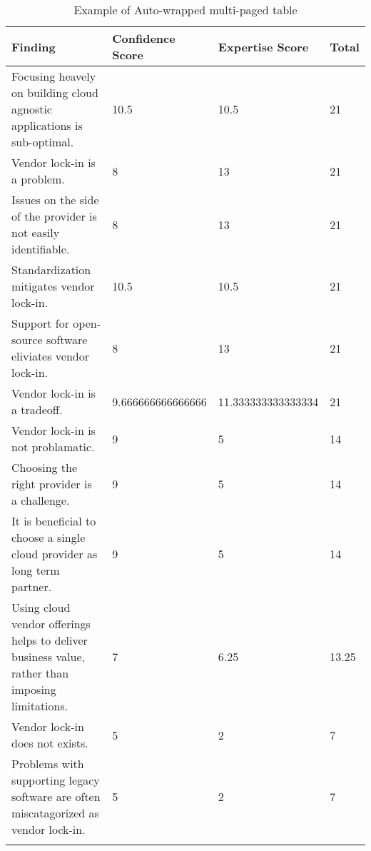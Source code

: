 
\renewcommand\arraystretch{1.5}%
\begin{longtable}{|p{10cm}|p{2cm}|p{2cm}|}
\hline
\textbf{Finding}  & \textbf{Confidence Score} & \textbf{Expertise Score} & \textbf{Total} \\ \hline
\endhead
Focusing heavely on building cloud agnostic applications is sub-optimal. & 10.5 & 10.5 & 21 \\ \hline
Vendor lock-in is a problem. & 8 & 13 & 21 \\ \hline
Issues on the side of the provider is not easily identifiable. & 8 & 13 & 21 \\ \hline
Standardization mitigates vendor lock-in. & 10.5 & 10.5 & 21 \\ \hline
Support for open-source software eliviates vendor lock-in. & 8 & 13 & 21 \\ \hline
Vendor lock-in is a tradeoff. & 9.666666666666666 & 11.333333333333334 & 21 \\ \hline
Vendor lock-in is not problamatic. & 9 & 5 & 14 \\ \hline
Choosing the right provider is a challenge. & 9 & 5 & 14 \\ \hline
It is beneficial to choose a single cloud provider as long term partner. & 9 & 5 & 14 \\ \hline
Using cloud vendor offerings helps to deliver business value, rather than imposing limitations. & 7 & 6.25 & 13.25 \\ \hline
Vendor lock-in does not exists. & 5 & 2 & 7 \\ \hline
Problems with supporting legacy software are often miscatagorized as vendor lock-in. & 5 & 2 & 7 \\ \hline
\caption{Example of Auto-wrapped multi-paged table}
\label{tab:table1}
\end{longtable}

